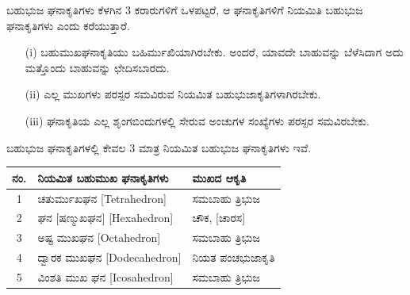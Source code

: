 ಬಹುಭುಜ ಘನಾಕೃತಿಗಳು ಕೆಳಗಿನ 3 ಕರಾರುಗಳಿಗೆ ಒಳಪಟ್ಟರೆ, ಆ ಘನಾಕೃತಿಗಳಿಗೆ ನಿಯಮಿತಿ ಬಹುಭುಜ ಘನಾಕೃತಿಗಳು ಎಂದು ಕರೆಯುತ್ತಾರೆ.
\begin{itemize}
\item[(i)] ಬಹುಮುಖಘನಾಕೃತಿಯು ಬಹಿರ್ಮುಖಿಯಾಗಿರಬೇಕು. ಅಂದರೆ, ಯಾವದೇ ಬಾಹುವನ್ನು ಬೆಳೆಸಿದಾಗ ಅದು ಮತ್ತೊಂದು ಬಾಹುವನ್ನು ಛೇದಿಸಬಾರದು.

\item[(ii)] ಎಲ್ಲ ಮುಖಗಳು ಪರಸ್ಪರ ಸಮವಿರುವ ನಿಯಮಿತ ಬಹುಭುಜಾಕೃತಿಗಳಾಗಿರಬೇಕು.

\item[(iii)] ಘನಾಕೃತಿಯ ಎಲ್ಲ ಶೃಂಗಬಿಂದುಗಳಲ್ಲಿ ಸೇರುವ ಅಂಚುಗಳ ಸಂಖ್ಯೆಗಳು ಪರಸ್ಪರ ಸಮವಿರಬೇಕು. 
\end{itemize}

ಬಹುಭುಜ ಘನಾಕೃತಿಗಳಲ್ಲಿ ಕೇವಲ 3 ಮಾತ್ರ ನಿಯಮಿತ ಬಹುಭುಜ ಘನಾಕೃತಿಗಳು ಇವೆ. 

\begin{tabular}{|c|l|l|}
\hline
ನಂ. & ನಿಯಮಿತ ಬಹುಮುಖ ಘನಾಕೃತಿಗಳು & ಮುಖದ ಆಕೃತಿ \\
\hline
1 & ಚತುರ್ಮುಖಘನ [Tetrahedron] &  ಸಮಬಾಹು ತ್ರಿಭುಜ\\
\hline
2 &ಘನ [ಷಣ್ಮುಖಘನ] [Hexahedron] &  ಚೌಕ, [ಚಾರಸ]\\
\hline
3 & ಅಷ್ಟ ಮುಖಘನ [Octahedron] & ಸಮಬಾಹು ತ್ರಿಭುಜ\\
\hline
4 & ದ್ವಾರಕ ಮುಖಘನ [Dodecahedron] & ನಿಯತ ಪಂಚಭುಜಾಕೃತಿ\\
\hline
5 & ವಿಂಶತಿ ಮುಖ ಘನ [Icosahedron] &  ಸಮಬಾಹು ತ್ರಿಭುಜ \\
\hline
\end{tabular}

\medskip 

